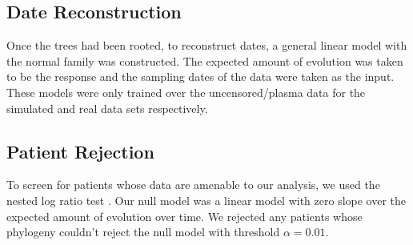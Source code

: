\subsection{Date Reconstruction} \label{subsec:daterecon}
Once the trees had been rooted, to reconstruct dates, a general linear model with the normal family was constructed. The expected amount of evolution was taken to be the response and the sampling dates of the data were taken as the input. These models were only trained over the uncensored/plasma data for the simulated and real data sets respectively.

\subsection{Patient Rejection} \label{subsec:hypot}
To screen for patients whose data are amenable to our analysis, we used the nested log ratio test \citep{Ho14}. Our null model was a linear model with zero slope over the expected amount of evolution over time. We rejected any patients whose phylogeny couldn't reject the null model with threshold $\alpha=0.01$.

